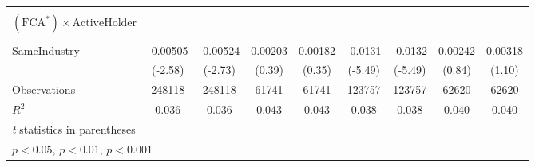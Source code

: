 {\begin{tabular}{l*{8}{c}}
                &                  &                  &                  &                  &                  &                  &                  &                  \\
[1em]
 $ (\text{FCA}^*) \times {\text{ActiveHolder} }  $ &                  &                  &                  &                  &                  &                  &                  &                  \\
                &                  &                  &                  &                  &                  &                  &                  &                  \\
[1em]
SameIndustry    & -0.00505\sym{*}  & -0.00524\sym{**} &  0.00203         &  0.00182         &  -0.0131\sym{***}&  -0.0132\sym{***}&  0.00242         &  0.00318         \\
                &  (-2.58)         &  (-2.73)         &   (0.39)         &   (0.35)         &  (-5.49)         &  (-5.49)         &   (0.84)         &   (1.10)         \\
\hline
Observations    &   248118         &   248118         &    61741         &    61741         &   123757         &   123757         &    62620         &    62620         \\
\(R^{2}\)       &    0.036         &    0.036         &    0.043         &    0.043         &    0.038         &    0.038         &    0.040         &    0.040         \\
\hline\hline
\multicolumn{9}{l}{\footnotesize \textit{t} statistics in parentheses}\\
\multicolumn{9}{l}{\footnotesize \sym{*} \(p<0.05\), \sym{**} \(p<0.01\), \sym{***} \(p<0.001\)}\\
\end{tabular}
}
